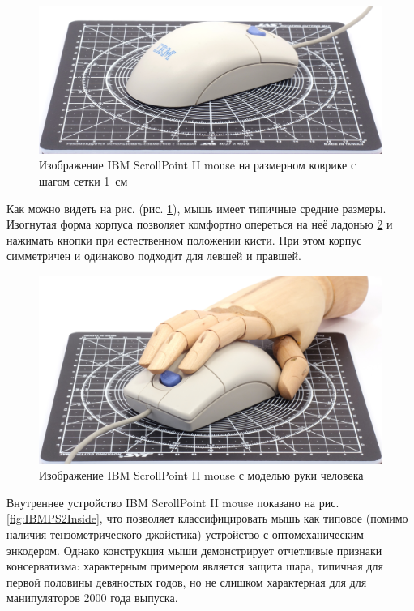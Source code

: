 \documentclass[11pt, a4paper]{article}
\begin{document}
\begin{figure}[h]
    \centering
    \includegraphics[scale=0.54]{2000_ibm_scrollpoint_ii_mouse/size_30.jpg}
    \caption{Изображение IBM ScrollPoint II mouse на размерном коврике с шагом сетки 1~см}
    \label{fig:IBMPS2Size}
\end{figure}

Как можно видеть на рис. (рис. \ref{fig:IBMPS2Size}), мышь имеет типичные средние размеры. Изогнутая форма корпуса позволяет комфортно опереться на неё ладонью  \ref{fig:IBMScrollPointIIHand} и нажимать кнопки при естественном положении кисти. При этом корпус симметричен и одинаково подходит для левшей и правшей.


\begin{figure}[h]
    \centering
    \includegraphics[scale=0.6]{2000_ibm_scrollpoint_ii_mouse/hand_30.jpg}
    \caption{Изображение IBM ScrollPoint II mouse с моделью руки человека}
    \label{fig:IBMScrollPointIIHand}
\end{figure}

Внутреннее устройство IBM ScrollPoint II mouse показано на рис. \ref{fig:IBMPS2Inside}, что позволяет классифицировать мышь как типовое (помимо наличия тензометрического джойстика) устройство с оптомеханическим энкодером. Однако конструкция мыши демонстрирует отчетливые признаки консерватизма: характерным примером является защита шара, типичная для первой половины девяностых годов, но не слишком характерная для для манипуляторов 2000 года выпуска.
\end{document}
